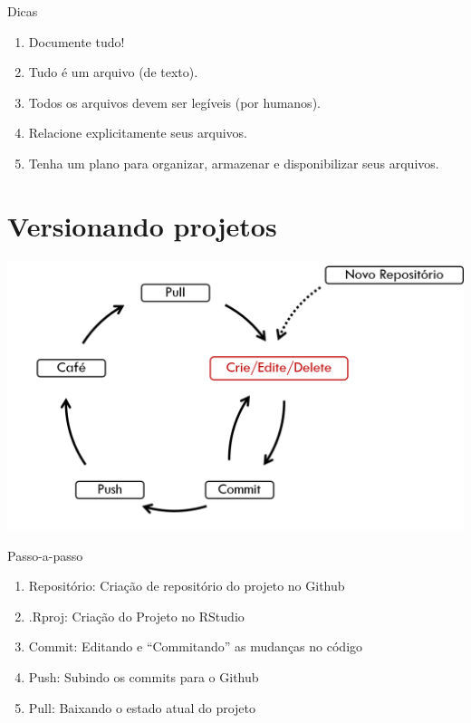 \documentclass[
  9pt,
  ignorenonframetext,
]{beamer}
\begin{document}
\begin{frame}{Dicas}
\protect\hypertarget{dicas}{}
\begin{enumerate}
\item
  Documente tudo!
\item
  Tudo é um arquivo (de texto).
\item
  Todos os arquivos devem ser legíveis (por humanos).
\item
  Relacione explicitamente seus arquivos.
\item
  Tenha um plano para organizar, armazenar e disponibilizar seus
  arquivos.
\end{enumerate}
\end{frame}

\hypertarget{versionando-projetos}{%
\section{Versionando projetos}\label{versionando-projetos}}

\begin{frame}{}
\protect\hypertarget{section-1}{}
\begin{center}\includegraphics[width=0.8\linewidth]{imgs/fluxo_github_rstudio} \end{center}
\end{frame}

\begin{frame}{Passo-a-passo}
\protect\hypertarget{passo-a-passo}{}
\begin{enumerate}
\item
  Repositório: Criação de repositório do projeto no Github
\item
  .Rproj: Criação do Projeto no RStudio
\item
  Commit: Editando e ``Commitando'' as mudanças no código
\item
  Push: Subindo os commits para o Github
\item
  Pull: Baixando o estado atual do projeto
\end{enumerate}
\end{frame}
\end{document}

